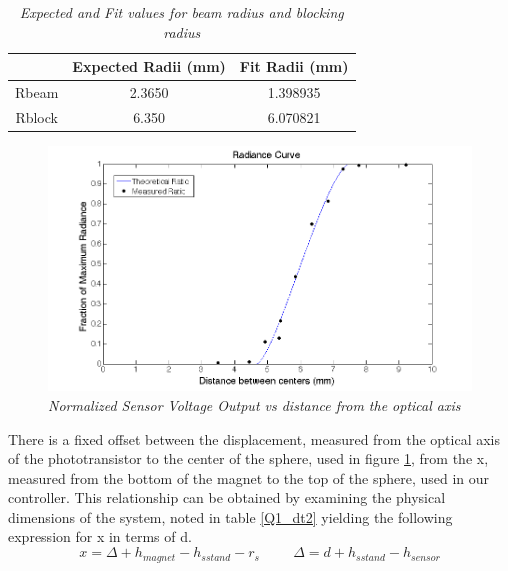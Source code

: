\documentclass{article}
\theoremstyle{plain}
\theoremstyle{definition}
\theoremstyle{remark}
\begin{document}
\begin{table}
\begin{center}
    \begin{tabular}{|c|c|c|}
        \hline
        ~      & Expected Radii (mm) & Fit Radii (mm) \\ \hline
        Rbeam  & 2.3650              & 1.398935       \\ 
        Rblock & 6.350               & 6.070821       \\
        \hline
    \end{tabular}
\caption{\emph{Expected and Fit values for beam radius and blocking radius}}
\label{Q1_dt1}
\end{center}
\end{table}

\begin{figure}
\begin{center}
\includegraphics[width = 15cm]{SensorRadianceCurve.png}
\caption{\emph{Normalized Sensor Voltage Output vs distance from the optical axis}}
\label{Q1_d1}
\end{center}
\end{figure}

There is a fixed offset between the displacement, measured from the optical axis of the phototransistor to the center of the sphere, used in figure \ref{Q1_d1}, from the x, measured from the bottom of the magnet to the top of the sphere, used in our controller.  This relationship can be obtained by examining the physical dimensions of the system, noted in table \ref{Q1_dt2} yielding the following expression for x in terms of d.\\

$$ x = \Delta + h_{magnet} - h_{s stand} - r_{s} \hspace{1cm} \Delta = d + h_{s stand} - h_{sensor} $$
\end{document}

